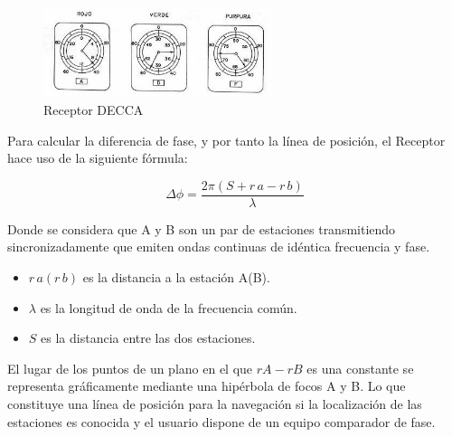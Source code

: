 \begin{figure}[!h]
  \centering
  \includegraphics[width=0.6\textwidth]{Imagenes/06.01.adf/DECCA-0002.jpg}
  \caption{Receptor DECCA}
  \label{fig:DECCA-receptor-2}
\end{figure}

Para calcular la diferencia de fase, y por tanto la l\'inea de posici\'on, el Receptor hace uso de la siguiente f\'ormula:

\[
\Delta \phi =\displaystyle  \frac{2\pi\left(S+r\,a-r\,b\right)}{\lambda}
\]

Donde se considera que A y B son un par de estaciones transmitiendo sincronizadamente que emiten ondas continuas de id\'entica frecuencia y fase.

\begin{itemize}
\item $r\,a(r\,b)$ es la distancia a la estaci\'on A(B).

\item $\lambda$ es la longitud de onda de la frecuencia com\'un.


\item $S$ es la distancia entre las dos estaciones.
\end{itemize}


El lugar de los puntos de un plano en el que $rA-rB$ es una constante se representa gr\'aficamente mediante una hip\'erbola de focos A y B. Lo que constituye una l\'inea de posici\'on para la navegaci\'on si la localizaci\'on de las estaciones es conocida y el usuario dispone de un equipo comparador de fase.

